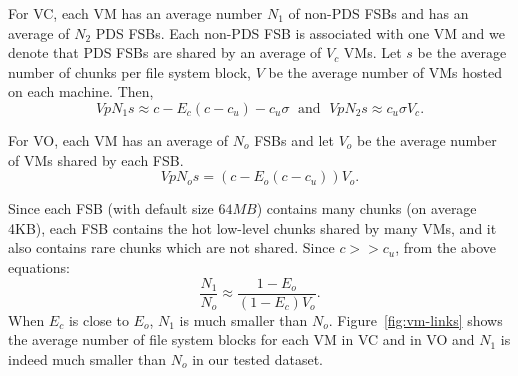 For VC, each VM has an average number $N_1$ of non-PDS FSBs
and  has  an average of  $N_2$ PDS FSBs. 
Each non-PDS FSB is associated with one VM
 and  we denote that PDS FSBs are
shared by an average of $V_c$ VMs. Let $s$ be the average number of chunks per file system block, 
$V$ be the average number of VMs hosted on each machine. Then, 
\[
V pN_1 s  \approx c-E_c(c-c_u) - c_u\sigma\; \mbox{ and } \; 
V pN_2 s  \approx c_u \sigma V_c.
\]

For VO, each VM has an average of $N_o$ FSBs
and let $V_o$ be the average number of VMs shared by each FSB.
\[
V pN_o s  = (c- E_o(c-c_u) ) V_o.
\]

Since each FSB (with default size $64MB$) contains many chunks (on average 4KB),
each FSB contains the hot low-level chunks shared by many VMs, and it also contains
rare chunks which are not shared.  Since $c>> c_u$, from the above equations:
\[
\frac{N_1}{N_o} \approx  \frac{1-E_o}{(1-E_c) V_o}.
\] 
When $E_c$ is close to $E_o$,
$N_1$ is much smaller than $N_o$. 
Figure~\ref{fig:vm-links} shows the average number of file system blocks for each VM in VC and in VO
and  $N_1$ is indeed  much smaller than $N_o$ in our tested dataset.  



